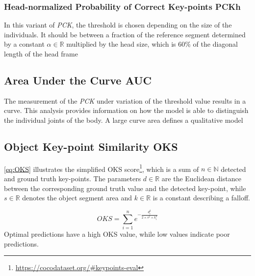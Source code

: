 \subsubsection{Head-normalized Probability of Correct Key-points PCKh}
In this variant of \emph{PCK}, the threshold is chosen depending on the size of the individuals. It should be between a fraction of the reference segment determined by a constant $\alpha \in \mathbb{R}$ multiplied by the head size, which is 60\% of the diagonal length of the head frame %

\subsection{Area Under the Curve AUC}
The measurement of the \emph{PCK} under variation of the threshold value results in a curve. This analysis provides information on how the model is able to distinguish the individual joints of the body. A large curve area defines a qualitative model %

\subsection{Object Key-point Similarity OKS}
\autoref{eq:OKS} illustrates the simplified OKS score\footnote{\url{https://cocodataset.org/\#keypoints-eval}}, which is a sum of $ n \in \mathbb{N}$ detected and ground truth key-points. The parameters $d \in \mathbb{R}$ are the Euclidean distance between the corresponding ground truth value and the detected key-point, while $s \in \mathbb{R}$ denotes the object segment area and $k \in \mathbb{R}$ is a constant describing a falloff. 

\begin{equation}
    \label{eq:OKS}
    OKS = \sum_{i=1}^{n} e^{- \frac{d_{i}^{2}}{2 \times s^{2} \times k_{i}^{2}}}
\end{equation}
Optimal predictions have a high OKS value, while low values indicate poor predictions. 
